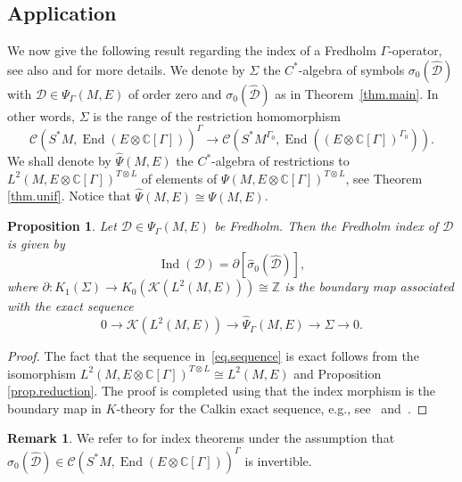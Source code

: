 \documentclass[11pt,a4paper]{amsart}
\newcommand{\End}{\operatorname{End}}
\newcommand{\Ind}{\operatorname{Ind}}
\newcommand{\C}{\mathbb C}
\newcommand{\Z}{\mathbb Z}
\newcommand{\maC}{\mathcal C}
\newcommand{\maD}{\mathcal D}
\newcommand{\maK}{\mathcal K}
\newcommand\<{\langle}
\renewcommand\>{\rangle}
\newtheorem{proposition}[theorem]{Proposition}
\theoremstyle{definition}
\newtheorem{remark}[theorem]{Remark}
\begin{document}
\subsection*{Application}
We now give the following result regarding the index of a Fredholm $\Gamma$-operator, 
see also \cite[Theorem 5.3]{BCLN2} and \cite{Nistor.Higher.Index} for more details. 
We denote by $\Sigma$ the $C^*$-algebra of symbols $ {\sigma}_0(\hat{\maD})$ with $\maD \in \Psi_\Gamma(M,E)$ of order zero
and $ {\sigma}_0(\hat{\maD})$ as in Theorem~\ref{thm.main}. In other words,
$\Sigma$ is the range of the restriction homomorphism 
$$
\maC(S^*M,\End(E \otimes \C[\Gamma]))^\Gamma \longrightarrow \maC(S^*M^{\Gamma_0},\End((E\otimes \C[\Gamma])^{\Gamma_0})).
$$
 We shall denote by $\hat{\Psi}(M,E)$ the $C^*$-algebra 
of restrictions to $L^2(M,E\otimes \C[\Gamma])^{T\otimes L}$ of elements of $\Psi(M,E\otimes \C[\Gamma])^{T\otimes L}$, see Theorem \ref{thm.unif}. Notice that $\hat{\Psi}(M,E) \cong \Psi(M,E)$.


\begin{proposition}
Let $\maD \in \Psi_\Gamma(M,E)$ be Fredholm. Then the Fredholm index of $\maD$ is given by
$$\Ind(\maD)=\partial [\widehat{\sigma}_0(\hat{\maD})],$$
where 
$\partial : K_1(\Sigma) \rightarrow K_0(\maK(L^2(M,E)))\cong \Z$ 
is the boundary map associated with the exact sequence
\begin{equation}\label{eq.sequence}
0  \longrightarrow \maK(L^2(M,E)) \longrightarrow \hat{\Psi}_\Gamma(M,E) \longrightarrow \Sigma  \longrightarrow 0.
\end{equation}
\end{proposition}  

\begin{proof}
The fact that the sequence in~\eqref{eq.sequence} is exact follows from the isomorphism 
$L^2(M,E\otimes \C[\Gamma])^{T\otimes L}\cong L^2(M,E)$ and Proposition \ref{prop.reduction}.
The proof is completed using that the index morphism is the boundary map in $K$-theory for the Calkin exact sequence, e.g., see~\cite[Theorem 5.3]{BCLN2} and~\cite{Nistor.Higher.Index}.
\end{proof}

\begin{remark}
We refer to \cite{Antonevich1973,NSSBook,Savin.unif} for index theorems under the assumption that $\sigma_0(\hat{\maD}) \in \maC(S^*M, \End(E\otimes \C[\Gamma]))^\Gamma$ is invertible.
\end{remark}
\end{document}
